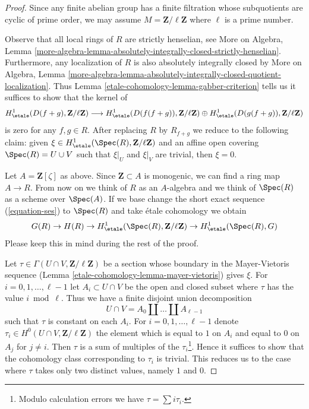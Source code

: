 \begin{proof}
Since any finite abelian group has a finite filtration whose
subquotients are cyclic of prime order, we may assume
$M = \mathbf{Z}/\ell\mathbf{Z}$ where $\ell$ is a prime number.

\medskip\noindent
Observe that all local rings of $R$ are strictly henselian, see
More on Algebra, Lemma
\ref{more-algebra-lemma-absolutely-integrally-closed-strictly-henselian}.
Furthermore, any localization of $R$ is also absolutely integrally closed
by More on Algebra, Lemma
\ref{more-algebra-lemma-absolutely-integrally-closed-quotient-localization}.
Thus Lemma \ref{etale-cohomology-lemma-gabber-criterion} tells us it suffices to
show that the kernel of
$$
H^1_\etale(D(f + g), \mathbf{Z}/\ell\mathbf{Z})
\longrightarrow
H^1_\etale(D(f(f + g)), \mathbf{Z}/\ell\mathbf{Z}) \oplus
H^1_\etale(D(g(f + g)), \mathbf{Z}/\ell\mathbf{Z})
$$
is zero for any $f, g \in R$. After replacing $R$ by $R_{f + g}$ we
reduce to the following claim: given
$\xi \in H^1_\etale(\Spec(R), \mathbf{Z}/\ell\mathbf{Z})$
and an affine open covering $\Spec(R) = U \cup V$
such that $\xi|_U$ and $\xi|_V$ are trivial, then $\xi = 0$.

\medskip\noindent
Let $A = \mathbf{Z}[\zeta]$ as above.
Since $\mathbf{Z} \subset A$ is monogenic, we can find a ring
map $A \to R$. From now on we think of $R$ as an $A$-algebra
and we think of $\Spec(R)$ as a scheme over $\Spec(A)$.
If we base change the short exact sequence (\ref{equation-ses})
to $\Spec(R)$ and take \'etale cohomology we obtain
$$
G(R) \to H(R) \to
H^1_\etale(\Spec(R), \mathbf{Z}/\ell\mathbf{Z}) \to
H^1_\etale(\Spec(R), G)
$$
Please keep this in mind during the rest of the proof.

\medskip\noindent
Let $\tau \in \Gamma(U \cap V, \mathbf{Z}/\ell\mathbf{Z})$
be a section whose boundary in the Mayer-Vietoris sequence
(Lemma \ref{etale-cohomology-lemma-mayer-vietoris}) gives $\xi$.
For $i = 0, 1, \ldots, \ell - 1$ let $A_i \subset U \cap V$
be the open and closed subset where $\tau$ has the value $i \bmod \ell$.
Thus we have a finite disjoint union decomposition
$$
U \cap V = A_0 \amalg \ldots \amalg A_{\ell - 1}
$$
such that $\tau$ is constant on each $A_i$. For
$i = 0, 1, \ldots, \ell - 1$
denote $\tau_i \in H^0(U \cap V, \mathbf{Z}/\ell\mathbf{Z})$
the element which is equal to $1$ on $A_i$ and
equal to $0$ on $A_j$ for $j \not = i$.
Then $\tau$ is a sum of multiples of the $\tau_i$\footnote{Modulo
calculation errors we have $\tau = \sum i \tau_i$.}.
Hence it suffices to show that the cohomology class corresponding
to $\tau_i$ is trivial. This reduces us to the case where
$\tau$ takes only two distinct values, namely $1$ and $0$.


\end{proof}
